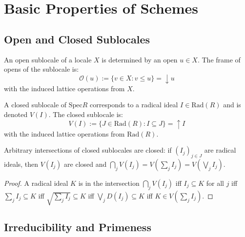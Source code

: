 
\chapter{Basic Properties of Schemes}

\section{Open and Closed Sublocales}

\begin{definition}
  \label{def:open-sublocale}
  \leanok
  An open sublocale of a locale $X$ is determined by an open $u \in X$. 
  The frame of opens of the sublocale is:
  $$\mathcal{O}(u) := \{v \in X : v \leq u\} = \downarrow u$$
  with the induced lattice operations from $X$.
\end{definition}

\begin{definition}
  \label{def:closed-sublocale}
  \leanok
  A closed sublocale of $\mathrm{Spec} R$ corresponds to a radical ideal $I \in \mathrm{Rad}(R)$ and is denoted $V(I)$.
  The closed sublocale is:
  $$V(I) := \{J \in \mathrm{Rad}(R) : I \subseteq J\} = \uparrow I$$
  with the induced lattice operations from $\mathrm{Rad}(R)$.
\end{definition}

\begin{lemma}
  \label{lemma:closed-sublocales-unions}
  \leanok
  Arbitrary intersections of closed sublocales are closed: if $(I_j)_{j \in J}$ are radical ideals, then $V(I_j)$ 
  are closed and $\bigcap_j V(I_j) = V(\sum_j I_j) = V(\bigvee_j I_j)$.
\end{lemma}

\begin{proof}
  \leanok
  A radical ideal $K$ is in the intersection $\bigcap_j V(I_j)$ iff $I_j \subseteq K$ for all $j$ iff $\sum_j I_j \subseteq K$
  iff $\sqrt{\sum_j I_j} \subseteq K$ iff $\bigvee_j D(I_j) \subseteq K$ iff $K \in V(\sum_j I_j)$.
\end{proof}

\section{Irreducibility and Primeness}

